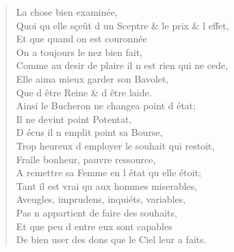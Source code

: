\begin{verse}
\vin La chose bien examinée, \\
Quoi qu\textquotesingle{} elle sçeût d\textquotesingle{} un Sceptre \& le prix \& l\textquotesingle{} effet, \\
\vin Et que quand on est couronnée \\
\vin On a toujours le nez bien fait, \\
Comme au desir de plaire il n\textquotesingle{} est rien qui ne cede, \\
\vin Elle aima mieux garder son Bavolet, \\
\vin Que d\textquotesingle{} être Reine \& d\textquotesingle{} être laide. \\
Ainsi le Bucheron ne changea point d\textquotesingle{} état; \\
\vin Il ne devint point Potentat, \\
\vin D\textquotesingle{} écus il n\textquotesingle{} emplit point sa Bourse, \\
Trop heureux d\textquotesingle{} employer le souhait qui restoit, \\
\vin Fraîle bonheur, pauvre ressource, \\
A remettre sa Femme en l\textquotesingle{} état qu\textquotesingle{} elle étoit; \\
\vin Tant il est vrai qu\textquotesingle{} aux hommes miserables, \\
Aveugles, imprudens, inquiéts, variables, \\
\vin Pas n\textquotesingle{} appartient de faire des souhaits, \\
\vin Et que peu d\textquotesingle{} entre eux sont capables \\
De bien user des dons que le Ciel leur a faits.
\end{verse}

